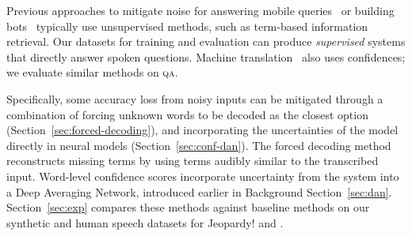 Previous approaches to mitigate \asr{} noise for answering mobile
queries~\citep{mishra2010qme} or building bots~\citep{leuski2009building} typically use unsupervised methods, such as term-based information retrieval.
 Our datasets for training and evaluation can produce \textit{supervised} systems that directly answer spoken questions. Machine translation~\citep{sperber17emnlp} also uses \asr{} confidences; we evaluate similar methods on \textsc{qa}.


Specifically, some accuracy loss from noisy inputs can be mitigated
through a combination of forcing unknown words to be decoded as the closest option
(Section~\ref{sec:forced-decoding}), and incorporating the uncertainties of
the \asr{} model directly in neural models (Section~\ref{sec:conf-dan}).  
%
The forced decoding method reconstructs missing terms by using terms audibly similar to the transcribed input.
%
Word-level confidence scores incorporate uncertainty from the \asr{}
system into a Deep Averaging Network, introduced earlier in Background Section~\ref{sec:dan}.
%
Section~\ref{sec:exp} compares these methods against baseline methods
on our synthetic and human speech datasets for Jeopardy! and \qb{}.